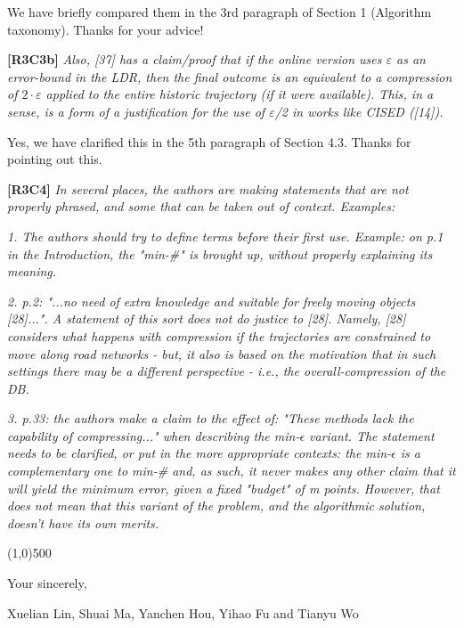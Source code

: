 \documentclass{letter}
\begin{document}
We have briefly compared them in the 3rd paragraph of Section 1 (Algorithm taxonomy). Thanks for your advice!

\textbf{[R3C3b]} \emph{Also, [37] has a claim/proof that if the online version uses $\varepsilon$ as an error-bound in the LDR, then the final outcome is an equivalent to a compression of $2 \cdot \varepsilon$ applied to the entire historic trajectory (if it were available). This, in a sense, is a form of a justification  for the use of $\varepsilon$/2 in works like CISED ([14]).}

Yes, we have clarified this in the 5th paragraph of Section 4.3. Thanks for pointing out this.

\textbf{[R3C4]} \emph{
In several places, the authors are making statements that are not properly phrased, and some that can be taken out of context. Examples:}

\emph{1. The authors should try to define terms before their first use. Example: on p.1 in the Introduction, the "min-\#" is brought up, without properly explaining its meaning.}


\emph{2. p.2: "...no need of extra knowledge and suitable for freely moving objects [28]...". A statement of this sort does not do justice to [28].
Namely, [28] considers what happens with compression if the trajectories are constrained to move along road networks - but, it also is based on the motivation that in such settings there may be a different perspective - i.e., the overall-compression of the DB.}



\emph{3. p.33: the authors make a claim to the effect of: "These methods lack the capability of compressing..." when describing the min-$\epsilon$ variant. The statement needs to be clarified, or put in the more appropriate contexts: the min-$\epsilon$  is a complementary one to min-\# and, as such, it never makes any other claim that it will yield the minimum error, given a fixed "budget" of m points. However, that does not mean that this variant of the problem, and the algorithmic solution, doesn't have its own merits.}



\line(1,0){500}



Your sincerely,

Xuelian Lin, Shuai Ma, Yanchen Hou, Yihao Fu and Tianyu Wo

%
%
\end{document}
